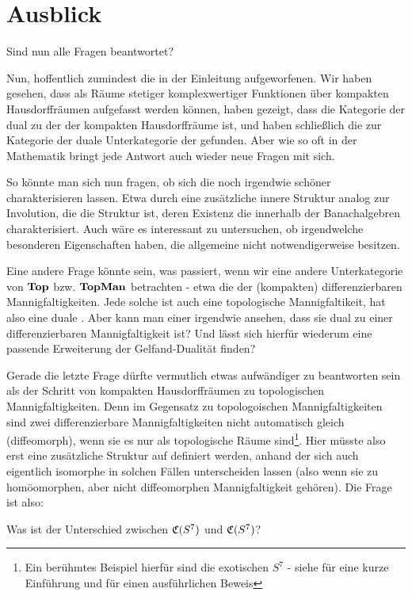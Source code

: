 {}
\section*{Ausblick}
\begin{center}
Sind nun alle Fragen beantwortet?
\end{center}

Nun, hoffentlich zumindest die in der Einleitung aufgeworfenen. Wir haben gesehen, dass \CAlgn{} als Räume stetiger komplexwertiger Funktionen über kompakten Hausdorffräumen aufgefasst werden können, haben gezeigt, dass die Kategorie der \CAlgn{} dual zu der der kompakten Hausdorffräume ist, und haben schließlich die zur Kategorie der \komTopMann{} duale Unterkategorie der \CAlgn{} gefunden. Aber wie so oft in der Mathematik bringt jede Antwort auch wieder neue Fragen mit sich.

So könnte man sich nun fragen, ob sich die \CAlgMann{} noch irgendwie \glqq schöner\grqq{} charakterisieren lassen. Etwa durch eine zusätzliche innere Struktur analog zur Involution, die die Struktur ist, deren Existenz die \CAlgn{} innerhalb der Banachalgebren charakterisiert. Auch wäre es interessant zu untersuchen, ob \CAlgMann{} irgendwelche besonderen Eigenschaften haben, die allgemeine \CAlgn{} nicht notwendigerweise besitzen.

Eine andere Frage könnte sein, was passiert, wenn wir eine andere Unterkategorie von $\mathbf{Top}$ bzw. $\mathbf{TopMan}$ betrachten - etwa die der (kompakten) differenzierbaren Mannigfaltigkeiten. Jede solche ist auch eine topologische Mannigfaltikeit, hat also eine duale \CAlgMan{}. Aber kann man einer \CAlgMan{} irgendwie ansehen, dass sie dual zu einer differenzierbaren Mannigfaltigkeit ist? Und lässt sich hierfür wiederum eine passende Erweiterung der Gelfand-Dualität finden? 

Gerade die letzte Frage dürfte vermutlich etwas aufwändiger zu beantworten sein als der Schritt von kompakten Hausdorffräumen zu topologischen Mannigfaltigkeiten. Denn im Gegensatz zu topologoischen Mannigfaltigkeiten sind zwei differenzierbare Mannigfaltigkeiten nicht automatisch \glqq gleich\grqq{} (diffeomorph), wenn sie es nur als topologische Räume sind\footnote{Ein berühmtes Beispiel hierfür sind die exotischen $S^7$ - siehe \cite{Elwes2011} für eine kurze Einführung und \cite{Bognat2011} für einen ausführlichen Beweis}. Hier müsste also erst eine zusätzliche Struktur auf \CAlgn{} definiert werden, anhand der sich auch eigentlich isomorphe \CAlgn{} in solchen Fällen unterscheiden lassen (also wenn sie zu homöomorphen, aber nicht diffeomorphen Mannigfaltigkeit \glqq gehören\grqq). Die Frage ist also:

\begin{center}
Was ist der Unterschied zwischen $\mathfrak{C}(S^7)$ und $\mathfrak{C}(S^7)$?
\end{center}